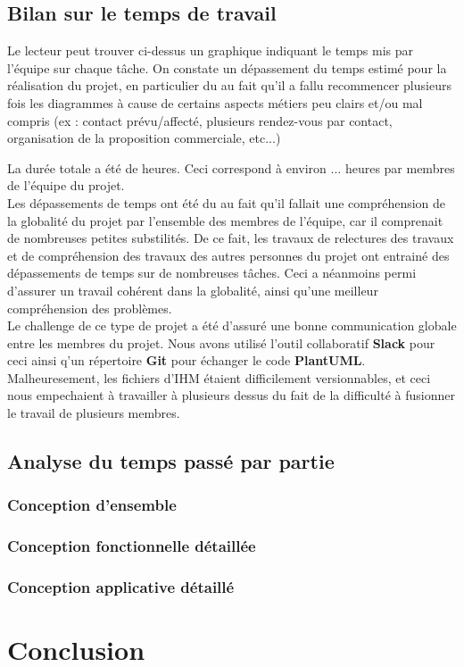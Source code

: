 \subsection*{Bilan sur le temps de travail}
  \begin{figure}[H]
    
  \end{figure}
  
Le lecteur peut trouver ci-dessus un graphique indiquant le temps mis par l'équipe sur chaque tâche.
On constate un dépassement du temps estimé pour la réalisation du projet, en particulier du au fait qu'il a fallu recommencer plusieurs fois les diagrammes à cause de certains aspects métiers peu clairs et/ou mal compris (ex : contact prévu/affecté, plusieurs rendez-vous par contact, organisation de la proposition commerciale, etc...)


La durée totale a été de  heures. Ceci correspond à environ ... heures par membres de l'équipe du projet.\\

Les dépassements de temps ont été du au fait qu'il fallait une compréhension de la globalité du projet par l'ensemble des membres de l'équipe, car il comprenait de nombreuses petites substilités. De ce fait, les travaux de relectures des travaux et de compréhension des travaux des autres personnes du projet ont entrainé des dépassements de temps sur de nombreuses tâches. Ceci a néanmoins permi d'assurer un travail cohérent dans la globalité, ainsi qu'une meilleur compréhension des problèmes.\\

Le challenge de ce type de projet a été d'assuré une bonne communication globale entre les membres du projet. Nous avons utilisé l'outil collaboratif \textbf{Slack} pour ceci ainsi q'un répertoire \textbf{Git} pour échanger le code \textbf{PlantUML}. Malheuresement, les fichiers d'IHM étaient difficilement versionnables, et ceci nous empechaient à travailler à plusieurs dessus du fait de la difficulté à fusionner le travail de plusieurs membres.

\subsection*{Analyse du temps passé par partie}
\subsubsection*{Conception d'ensemble}
\subsubsection*{Conception fonctionnelle détaillée}
\subsubsection*{Conception applicative détaillé}

\section*{Conclusion}
\restoregeometry